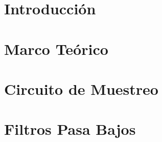 \documentclass[11pt]{article}
\newcounter{subsubsubsection}[subsubsection]
\begin{document}


\newpage

\newpage
\pagestyle{empty}
\renewcommand{\contentsname}{{\huge Índice}}
\setcounter{tocdepth}{4} %
\tableofcontents
\lhead{\the\materia}
\rhead{\the\grupo}

\newpage
\pagestyle{fancy} %

\setcounter{page}{1} %
\setcounter{equation}{0} %
\setcounter{figure}{0} %
\setcounter{table}{0} %

\section{Introducción}


\section{Marco Teórico}


\section{Circuito de Muestreo}


\section{Filtros Pasa Bajos}

\end{document}
